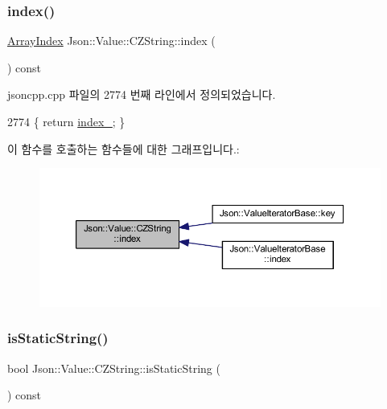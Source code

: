 \subsubsection{\texorpdfstring{index()}{index()}}
{\footnotesize\ttfamily \hyperlink{class_json_1_1_value_a184a91566cccca7b819240f0d5561c7d}{Array\+Index} Json\+::\+Value\+::\+C\+Z\+String\+::index (\begin{DoxyParamCaption}{ }\end{DoxyParamCaption}) const}



jsoncpp.\+cpp 파일의 2774 번째 라인에서 정의되었습니다.


\begin{DoxyCode}
2774 \{ \textcolor{keywordflow}{return} \hyperlink{class_json_1_1_value_1_1_c_z_string_aecf29982235c9c165a0971023ebbb270}{index\_}; \}
\end{DoxyCode}
이 함수를 호출하는 함수들에 대한 그래프입니다.\+:\nopagebreak
\begin{figure}[H]
\begin{center}
\leavevmode
\includegraphics[width=350pt]{class_json_1_1_value_1_1_c_z_string_a0f3ba09401525d4f01dafd577122ee32_icgraph}
\end{center}
\end{figure}
\mbox{\label{class_json_1_1_value_1_1_c_z_string_a5991dfa2f6c2ba318373c7429fcd7a57}} 
\subsubsection{\texorpdfstring{is\+Static\+String()}{isStaticString()}}
{\footnotesize\ttfamily bool Json\+::\+Value\+::\+C\+Z\+String\+::is\+Static\+String (\begin{DoxyParamCaption}{ }\end{DoxyParamCaption}) const}



